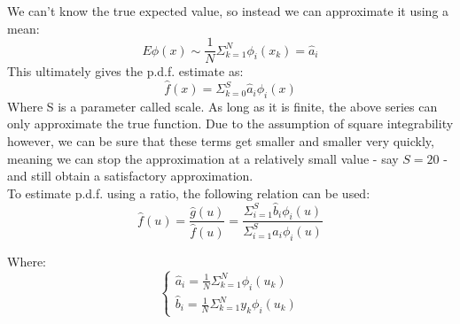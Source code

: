 {We can't know the true expected value, so instead we can approximate it using a mean:
\begin{equation}
    E\phi(x) \sim \frac{1}{N} \Sigma^{N}_{k=1}\phi_i(x_k) = \hat{a}_i
\end{equation}
This ultimately gives the p.d.f. estimate as:
\begin{equation}
    \hat{f}(x) = \Sigma_{k=0}^{S}\hat{a}_i\phi_i(x)
\end{equation}
Where S is a parameter called scale. As long as it is finite, the above series can only approximate the true function. Due to the assumption of square integrability however, we can be sure that these terms get smaller and smaller very quickly, meaning we can stop the approximation at a relatively small value - say $S = 20$ - and still obtain a satisfactory approximation.\\
To estimate p.d.f. using a ratio, the following relation can be used:
\begin{equation}
    \hat{f}(u) = \frac{\hat{g}(u)}{\hat{f}(u)} = \frac{\Sigma^{S}_{i=1}\hat{b}_i \phi_i(u)}{ \Sigma^{S}_{i=1}\hat{a}_i \phi_i(u)  }
\end{equation}


Where:
\begin{equation}
    \begin{cases}
        \hat{a}_i = \frac{1}{N}\Sigma^{N}_{k=1}\phi_i(u_k)\\
        \hat{b}_i = \frac{1}{N}\Sigma^{N}_{k=1}y_k \phi_i(u_k)
    \end{cases}
\end{equation}






}

